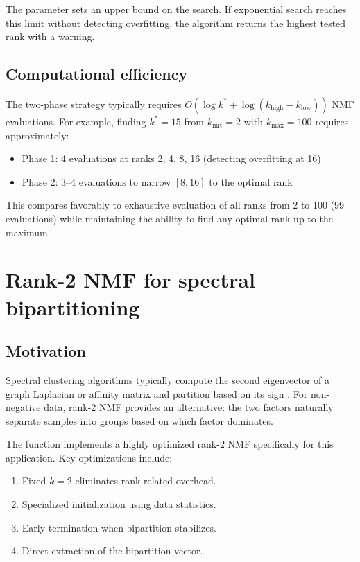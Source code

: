 \documentclass[article]{jss_modified}
\newcommand{\fct}[1]{\code{#1()}}
\begin{document}
The  parameter sets an upper bound on the search. If 
exponential search reaches this limit without detecting overfitting, the 
algorithm returns the highest tested rank with a warning.

\subsection{Computational efficiency}

The two-phase strategy typically requires $O(\log k^* + \log(k_{\text{high}} - 
k_{\text{low}}))$ NMF evaluations. For example, finding $k^* = 15$ from 
$k_{\text{init}} = 2$ with $k_{\max} = 100$ requires approximately:
\begin{itemize}
  \item Phase 1: 4 evaluations at ranks 2, 4, 8, 16 (detecting overfitting at 16)
  \item Phase 2: 3--4 evaluations to narrow $[8, 16]$ to the optimal rank
\end{itemize}

This compares favorably to exhaustive evaluation of all ranks from 2 to 100 
(99 evaluations) while maintaining the ability to find any optimal rank up to 
the maximum.


\section{Rank-2 NMF for spectral bipartitioning} \label{sec:bipartition}

\subsection{Motivation}

Spectral clustering algorithms typically compute the second eigenvector of a 
graph Laplacian or affinity matrix and partition based on its sign 
\citep{Shi2000}. For non-negative data, rank-2 NMF provides an alternative: the 
two factors naturally separate samples into groups based on which factor 
dominates.

The \fct{bipartition} function implements a highly optimized rank-2 NMF 
specifically for this application. Key optimizations include:

\begin{enumerate}
  \item Fixed $k=2$ eliminates rank-related overhead.
  \item Specialized initialization using data statistics.
  \item Early termination when bipartition stabilizes.
  \item Direct extraction of the bipartition vector.
\end{enumerate}
\end{document}
